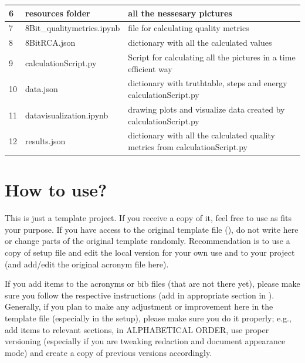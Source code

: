 \documentclass[]{IEEEtran}
\begin{document}
\begin{table}[h]
\begin{tabular}{|l|l|l|}
6 & resources folder  & all the nessesary pictures \\ \hline
7 & 8Bit_qualitymetrics.ipynb & file for calculating quality metrics \\ \hline
8 & 8BitRCA.json & dictionary with all the calculated values \\ \hline
9 & calculationScript.py & Script for calculating all the pictures in a time efficient way\\ \hline
10 & data.json & dictionary with truthtable, steps and energy  calculationScript.py  \\ \hline
11 & datavisualization.ipynb & drawing plots and visualize data created by  calculationScript.py \\ \hline
12 & results.json & dictionary with all the calculated quality metrics from calculationScript.py\\ \hline
\end{tabular}
\end{table}

\clearpage
\section{How to use?}
This is just a template project. If you receive a copy of it, feel free to use as fits your purpose. If you have access to the original template file (), do not write here or change parts of the original template randomly. Recommendation is to use a copy of setup file and edit the local version for your own use and  to your project (and add/edit the original acronym file here). 

If you add items to the acronyms or bib files (that are not there yet), please make sure you follow the respective instructions (add in appropriate section in ).\\





Generally, if you plan to make any adjustment or improvement here in the template file (especially in the setup), please make sure you do it properly; e.g., add items to relevant sections, in ALPHABETICAL ORDER, use proper versioning (especially if you are tweaking redaction and document appearance mode) and create a copy of previous versions accordingly.\\
\end{document}
